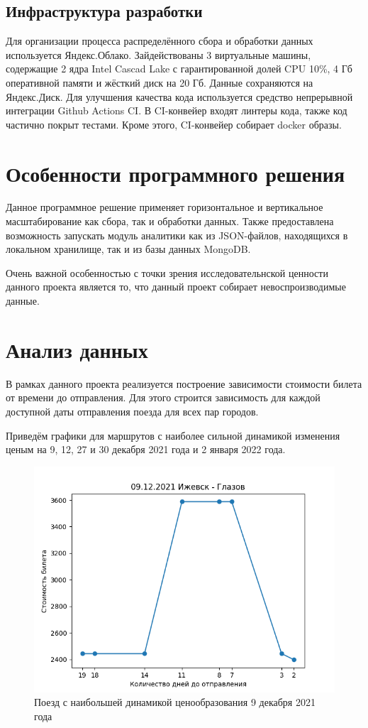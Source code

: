 \documentclass[conference]{IEEEtran}
\begin{document}
\subsection{Инфраструктура разработки}

Для организации процесса распределённого сбора и обработки данных используется Яндекс.Облако. Зайдействованы 3 виртуальные машины, содержащие 2 ядра Intel Cascad Lake с гарантированной долей CPU 10\%, 4 Гб оперативной памяти и жёсткий диск на 20 Гб. Данные сохраняются на Яндекс.Диск. Для улучшения качества кода используется средство непрерывной интеграции Github Actions CI. В CI-конвейер входят линтеры кода, также код частично покрыт тестами. Кроме этого, CI-конвейер собирает docker образы.

\section{Особенности программного решения}

Данное программное решение применяет горизонтальное и вертикальное масштабирование как сбора, так и обработки данных. Также предоставлена возможность запускать модуль аналитики как из JSON-файлов, находящихся в локальном хранилище, так и из базы данных MongoDB.

Очень важной особенностью с точки зрения исследовательнской ценности данного проекта является то, что данный проект собирает невоспроизводимые данные.

\section{Анализ данных}

В рамках данного проекта реализуется построение зависимости стоимости билета от времени до отправления. Для этого строится зависимость для каждой доступной даты отправления поезда для всех пар городов.

Приведём графики для маршрутов с наиболее сильной динамикой изменения ценым на 9, 12, 27 и 30 декабря 2021 года и 2 января 2022 года.

\begin{figure}
	\includegraphics[scale=0.5]{09122021}
	\caption{Поезд с наибольшей динамикой ценообразования 9 декабря 2021 года}
\end{figure}
\end{document}
